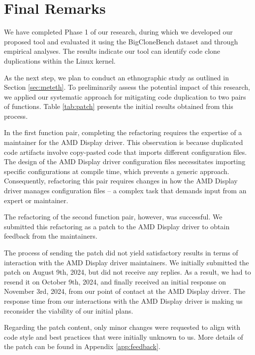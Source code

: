 \en

\section{Final Remarks}

We have completed Phase 1 of our research, during which we developed our proposed tool and evaluated it using the BigCloneBench dataset and through empirical analyses. The results indicate our tool can identify code clone duplications within the Linux kernel.

As the next step, we plan to conduct an ethnographic study as outlined in Section \ref{sec:meteth}. To preliminarily assess the potential impact of this research, we applied our systematic approach for mitigating code duplication to two pairs of functions. Table \ref{tab:patch} presents the initial results obtained from this process.



In the first function pair, completing the refactoring requires the expertise of a maintainer for the AMD Display driver. This observation is because duplicated code artifacts involve copy-pasted code that imports different configuration files. The design of the AMD Display driver configuration files necessitates importing specific configurations at compile time, which prevents a generic approach. Consequently, refactoring this pair requires changes in how the AMD Display driver manages configuration files -- a complex task that demands input from an expert or maintainer.

The refactoring of the second function pair, however, was successful. 
We submitted this refactoring as a patch to the AMD Display driver to obtain feedback 
from the maintainers. 

The process of sending the patch did not yield satisfactory results in terms of 
interaction with the AMD Display driver maintainers. We initially submitted the 
patch on August 9th, 2024, but did not receive any replies. As a result, we had 
to resend it on October 9th, 2024, and finally received an initial response on 
November 3rd, 2024, from our point of contact at the AMD Display driver. 
The response time from our interactions with the AMD Display driver is making 
us reconsider the viability of our initial plans.

Regarding the patch content, only minor changes were requested to align with code 
style and best practices that were initially unknown to us. More details of the 
patch can be found in Appendix \ref{app:feedback}.

